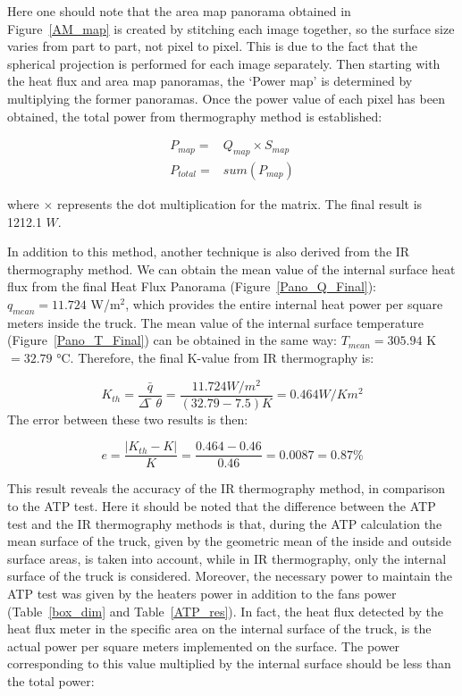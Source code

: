 Here one should note that the area map panorama obtained in Figure~\ref{AM_map} is created by stitching each image together, so the surface size varies from part to part, not pixel to pixel. This is due to the fact that the spherical projection is performed for each image separately.
Then starting with the heat flux and area map panoramas, the ‘Power map’ is determined by multiplying the former panoramas. Once the power value of each pixel has been obtained, the total power from thermography method is established:

\begin{align}
P_{map} =& Q_{map}×S_{map}  \\
P_{total} =& sum(P_{map})  
\end{align}

where $ × $ represents the dot multiplication for the matrix. The final result is 1212.1 $ W $.

In addition to this method, another technique is also derived from the IR thermography method. We can obtain the mean value of the internal surface heat flux from the final Heat Flux Panorama (Figure~\ref{Pano_Q_Final}): $q_{mean} = 11.724$  W/m$^2 $, which provides the entire internal heat power per square meters inside the truck. The mean value of the internal surface temperature (Figure~\ref{Pano_T_Final}) can be obtained in the same way: $ T_{mean} = 305.94$ K $= 32.79$ °C.
 Therefore, the final K-value from IR thermography is:

\begin{equation}
K_{th}=\frac{\bar{q}}{\Delta ̅\theta} =\frac{11.724 W/m^2}{(32.79-7.5) K}=0.464 W/K m^2 
\end{equation}
The error between these two results is then:

\begin{equation}
e=  \frac{|K_{th}-K|}{K}=\frac{0.464-0.46}{0.46}=0.0087=0.87\%
\end{equation}

This result reveals the accuracy of the IR thermography method, in comparison to the ATP test. Here it should be noted that the difference between the ATP test and the IR thermography methods is that, during the ATP calculation the mean surface of the truck, given by the geometric mean of the inside and outside surface areas, is taken into account, while in IR thermography, only the internal surface of the truck is considered. Moreover, the necessary power to maintain the ATP test was given by the heaters power in addition to the fans power (Table~\ref{box_dim} and Table~\ref{ATP_res}). In fact, the heat flux detected by the heat flux meter in the specific area on the internal surface of the truck, is the actual power per square meters implemented on the surface. The power corresponding to this value multiplied by the internal surface should be less than the total power:

